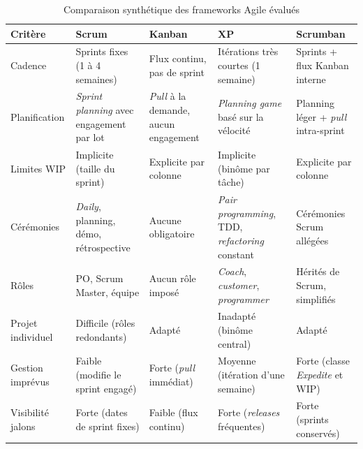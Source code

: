         \begin{table}[H]
        \centering
        \footnotesize
        \begin{tabular}{|m{2cm}|m{2.6cm}|m{2.6cm}|m{2.6cm}|m{2.8cm}|}
        \hline
        \textbf{Critère} & \textbf{Scrum} & \textbf{Kanban} & \textbf{XP} & \textbf{Scrumban} \\
        \hline
        Cadence
        & Sprints fixes (1 à 4 semaines)
        & Flux continu, pas de sprint
        & Itérations très courtes (1 semaine)
        & Sprints + flux Kanban interne \\
        \hline
        Planification
        & \textit{Sprint planning} avec engagement par lot
        & \textit{Pull} à la demande, aucun engagement
        & \textit{Planning game} basé sur la vélocité
        & Planning léger + \textit{pull} intra-sprint \\
        \hline
        Limites WIP
        & Implicite (taille du sprint)
        & Explicite par colonne
        & Implicite (binôme par tâche)
        & Explicite par colonne \\
        \hline
        Cérémonies
        & \textit{Daily}, planning, démo, rétrospective
        & Aucune obligatoire
        & \textit{Pair programming}, TDD, \textit{refactoring} constant
        & Cérémonies Scrum allégées \\
        \hline
        Rôles
        & PO, Scrum Master, équipe
        & Aucun rôle imposé
        & \textit{Coach}, \textit{customer}, \textit{programmer}
        & Hérités de Scrum, simplifiés \\
        \hline
        Projet individuel
        & Difficile (rôles redondants)
        & Adapté
        & Inadapté (binôme central)
        & Adapté \\
        \hline
        Gestion imprévus
        & Faible (modifie le sprint engagé)
        & Forte (\textit{pull} immédiat)
        & Moyenne (itération d'une semaine)
        & Forte (classe \textit{Expedite} et WIP) \\
        \hline
        Visibilité jalons
        & Forte (dates de sprint fixes)
        & Faible (flux continu)
        & Forte (\textit{releases} fréquentes)
        & Forte (sprints conservés) \\
        \hline
        \end{tabular}
        \caption{Comparaison synthétique des frameworks Agile évalués}
        \label{tab:agile_compare}
        \end{table}


